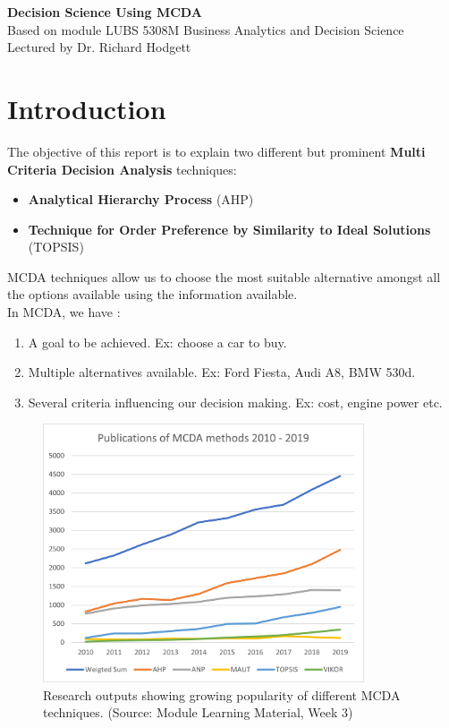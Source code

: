\documentclass[10pt, a4paper]{article}
\begin{document}
\begin{center}
\textbf{\Large Decision Science Using MCDA} \\
Based on module LUBS 5308M Business Analytics and Decision Science \\
Lectured by Dr. Richard Hodgett \\
\end{center}

\section*{Introduction}
The objective of this report is to explain two different but prominent \textbf{Multi Criteria Decision Analysis} techniques:
\begin{itemize}[noitemsep]
    \item \textbf{Analytical Hierarchy Process }(AHP)
    \item \textbf{Technique for Order Preference by Similarity to Ideal Solutions }(TOPSIS)
\end{itemize}
MCDA techniques allow us to choose the most suitable alternative amongst all the options available using the information available.\\
In MCDA, we have :
\begin{enumerate}[noitemsep]
    \item A goal to be achieved. Ex: choose a car to buy.
    \item Multiple alternatives available. Ex: Ford Fiesta, Audi A8, BMW 530d.
    \item Several criteria influencing our decision making. Ex: cost, engine power etc.
\end{enumerate}
\begin{figure}[h]
	\includegraphics[width=9.5cm]{LUBS5308M Week03 Img001 - MCDA Methods}
	\centering
	\caption{Research outputs showing growing popularity of different MCDA techniques. (Source: Module Learning Material, Week 3)}
    \end{figure}
\end{document}
